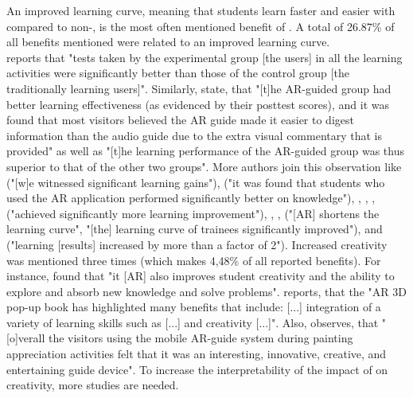 An improved learning curve, meaning that students learn faster and easier with \AR \apps compared to non-\AR \appsns, is the most often mentioned benefit of \ARns. A total of 26.87\% of all benefits mentioned were related to an improved learning curve. \\
\cite{Liu.2009} reports that "tests taken by the experimental group [the \AR \app users] in all the learning activities were significantly better than those of the control group [the traditionally learning users]".\autocite[525]{Liu.2009} Similarly, \cite{Chang.2014} state, that "[t]he AR-guided group had better learning effectiveness (as evidenced by their posttest scores), and it was found that most visitors believed the AR guide made it easier to digest information than the audio guide due to the extra visual commentary that is provided"\autocite[193]{Chang.2014} as well as "[t]he learning performance of the AR-guided group was thus superior to
that of the other two groups"\autocite[190]{Chang.2014}. More authors join this observation like \cite{Kamarainen.2013} ("[w]e witnessed significant learning gains"\autocite[550]{Kamarainen.2013}), \cite{Ibanez.2014} ("it was found that students who used the AR application performed significantly better on knowledge"\autocite[12]{Ibanez.2014}), \cite{Li.2011}, \cite{MartinGutierrez.2011}, \cite{Redondo.2013}, \cite{Liu.2009b} ("achieved significantly more learning improvement"\autocite[173]{Liu.2009b}), \cite{Zhang.2014}, \cite{Yeo.2011}, \cite{Hou.2013} ("[AR] shortens the learning curve"\autocite[450]{Hou.2013}, "[the] learning curve of trainees significantly improved"\autocite[451]{Hou.2013}), \cite{Wilson.2013} and \cite{Anderson.2013} ("learning [results] increased by more than a factor of 2"\autocite[318]{Anderson.2013}). 
Increased creativity was mentioned three times (which makes 4,48\% of all reported benefits). For instance, \cite{Liu.2009b} found that "it [AR] also improves student creativity and the ability to explore and absorb new knowledge and solve problems"\autocite[173]{Liu.2009b}. \cite{VateULan.2012} reports, that the "AR 3D pop-up book has highlighted many benefits that include: [...] integration of a variety of learning skills such as [...] and creativity [...]"\autocite[894]{VateULan.2012}. Also, \cite{Chang.2014} observes, that "[o]verall the visitors using the mobile AR-guide system during painting appreciation activities felt that it was an interesting, innovative, creative, and entertaining guide device"\autocite[194]{Chang.2014}. To increase the interpretability of the impact of \AR \apps on creativity, more studies are needed.
% 
